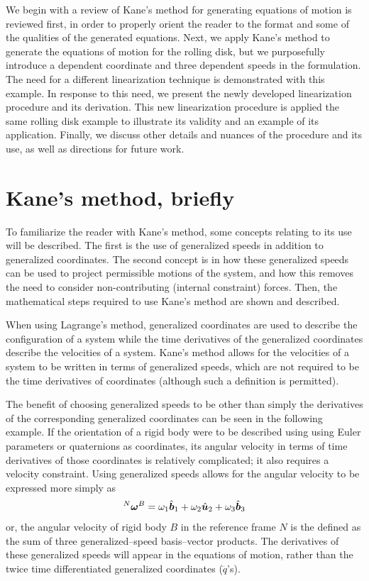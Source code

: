 We begin with a review of Kane's method for generating equations of motion is
reviewed first, in order to properly orient the reader to the format and some
of the qualities of the generated equations. Next, we apply Kane's method to
generate the equations of motion for the rolling disk, but we purposefully
introduce a dependent coordinate and three dependent speeds in the formulation.
The need for a different linearization technique is demonstrated with this
example. In response to this need, we present the newly developed linearization
procedure and its derivation. This new linearization procedure is applied the
same rolling disk example to illustrate its validity and an example of its
application. Finally, we discuss other details and nuances of the procedure and
its use, as well as directions for future work.

\section{Kane's method, briefly}
\label{sec:kane_method}
To familiarize the reader with Kane's method, some concepts relating to its use
will be described.  The first is the use of generalized speeds in addition to
generalized coordinates.  The second concept is in how these generalized speeds
can be used to project permissible motions of the system, and how this removes
the need to consider non-contributing (internal constraint) forces.  Then, the
mathematical steps required to use Kane's method are shown and described.

When using Lagrange's method, generalized coordinates are used to describe the
configuration of a system while the time derivatives of the generalized
coordinates describe the velocities of a system.  Kane's method allows for the
velocities of a system to be written in terms of generalized speeds, which are
not required to be the time derivatives of coordinates (although such a
definition is permitted).

The benefit of choosing generalized speeds to be other than simply the
derivatives of the corresponding generalized coordinates can be seen in the
following example. If the orientation of a rigid body were to be described
using using Euler parameters or quaternions as coordinates, its angular
velocity in terms of time derivatives of those coordinates is relatively
complicated; it also requires a velocity constraint. Using generalized speeds
allows for the angular velocity to be expressed more simply as
\begin{align}
\label{eq:ex1}
{^N}\boldsymbol{\omega}^B = \omega_1 \hat{\boldsymbol{b}}_{1} + \omega_2 \hat{\boldsymbol{u}}_{2} + \omega_3 \hat{\boldsymbol{b}}_{3}
\end{align}
or, the angular velocity of rigid body $B$ in the reference frame $N$ is the
defined as the sum of three generalized--speed basis--vector products.
The derivatives of these generalized speeds will appear in the equations
of motion, rather than the twice time differentiated generalized coordinates
($\ddot{{q}}$'s).

